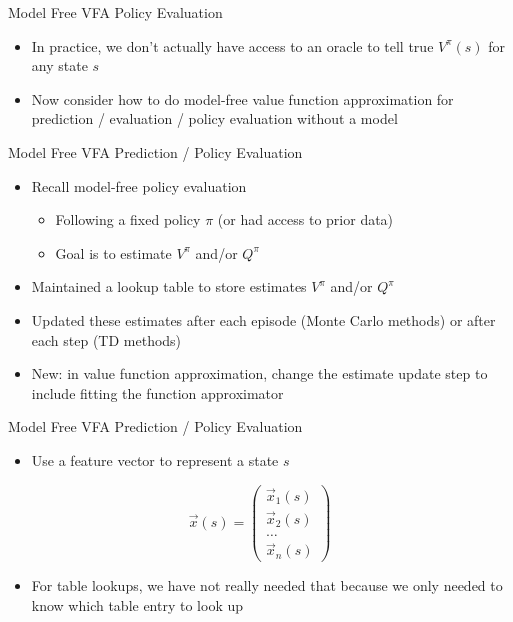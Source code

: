 \documentclass[aspectratio=169]{../latex_main/tntbeamer}  %
\begin{document}
\begin{frame}[c]{Model Free VFA Policy Evaluation}
	
	
	\begin{itemize}
		\item In practice, we don’t actually have access to an oracle to tell true $V^\pi(s)$ for any
		state $s$
		\item Now consider how to do model-free value function approximation for
		prediction / evaluation / policy evaluation without a model
	\end{itemize}
	
\end{frame}
\begin{frame}[c]{Model Free VFA Prediction / Policy Evaluation}
	
	
	\begin{itemize}
		\item Recall model-free policy evaluation
		\begin{itemize}
			\item Following a fixed policy $\pi$ (or had access to prior data)
			\item Goal is to estimate $V^\pi$ and/or $Q^\pi$
		\end{itemize}
		\item Maintained a lookup table to store estimates $V^\pi$ and/or $Q^\pi$
		\item Updated these estimates after each episode (Monte Carlo methods)
		or after each step (TD methods)
		\item New: in value function approximation, change the estimate
		update step to include fitting the function approximator
	\end{itemize}
	
\end{frame}
\begin{frame}[c]{Model Free VFA Prediction / Policy Evaluation}
	
	
	\begin{itemize}
		\item Use a feature vector to represent a state $s$
	\end{itemize}

$$\vec{x}(s) = \begin{pmatrix}
\vec{x}_1(s)\\
\vec{x}_2(s)\\
\ldots\\
\vec{x}_n(s)
\end{pmatrix} $$

\begin{itemize}
	\item For table lookups, we have not really needed that because we only needed to know which table entry to look up
\end{itemize}
	
\end{frame}
\end{document}
